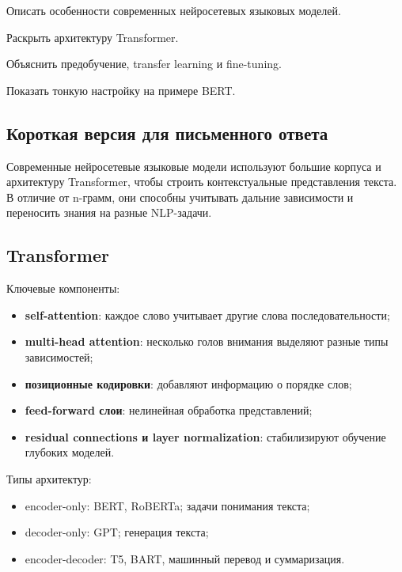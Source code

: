 
\begin{examplan}
    \item Описать особенности современных нейросетевых языковых моделей.
    \item Раскрыть архитектуру Transformer.
    \item Объяснить предобучение, transfer learning и fine-tuning.
    \item Показать тонкую настройку на примере BERT.
\end{examplan}

\subsection*{Короткая версия для письменного ответа}

Современные нейросетевые языковые модели используют большие корпуса и архитектуру Transformer, чтобы строить контекстуальные представления текста. В отличие от n-грамм, они способны учитывать дальние зависимости и переносить знания на разные NLP-задачи.

\subsection*{Transformer}

Ключевые компоненты:
\begin{itemize}
    \item \textbf{self-attention}: каждое слово учитывает другие слова последовательности;
    \item \textbf{multi-head attention}: несколько голов внимания выделяют разные типы зависимостей;
    \item \textbf{позиционные кодировки}: добавляют информацию о порядке слов;
    \item \textbf{feed-forward слои}: нелинейная обработка представлений;
    \item \textbf{residual connections и layer normalization}: стабилизируют обучение глубоких моделей.
\end{itemize}

Типы архитектур:
\begin{itemize}
    \item encoder-only: BERT, RoBERTa; задачи понимания текста;
    \item decoder-only: GPT; генерация текста;
    \item encoder-decoder: T5, BART, машинный перевод и суммаризация.
\end{itemize}

